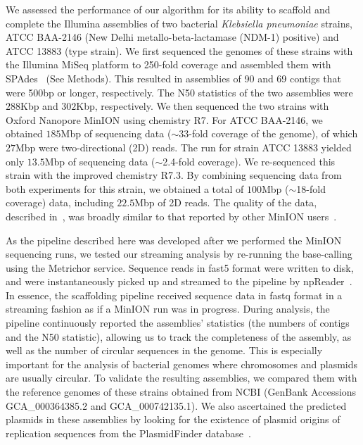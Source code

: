 We assessed the performance of our algorithm for its ability to scaffold and complete the
Illumina assemblies of two bacterial \emph{Klebsiella pneumoniae} strains, ATCC
BAA-2146 (New Delhi metallo-beta-lactamase (NDM-1) positive)
and ATCC 13883 (type strain).
We first sequenced the genomes of these strains with the Illumina MiSeq platform to 250-fold
coverage and assembled them with SPAdes~\cite{BankevichNA2012}
(See Methods). This resulted in assemblies of 90 and 69 contigs
that were 500bp or longer, respectively. The N50 statistics of the two
assemblies were $288$Kbp and $302$Kbp, respectively.
We then sequenced the two strains with Oxford Nanopore MinION using chemistry R7. 
For ATCC BAA-2146, we obtained $185$Mbp of sequencing data ($\sim$33-fold
coverage of the genome), of which $27$Mbp were two-directional (2D) reads. The run for strain ATCC
13883 yielded only $13.5$Mbp of sequencing data ($\sim$2.4-fold coverage). 
We re-sequenced this strain with the improved chemistry R7.3.
By combining sequencing data from both experiments for this strain, we obtained
a total of $100$Mbp ($\sim$18-fold coverage) data, including $22.5$Mbp of 2D reads.
The quality of the data, described in~\cite{CaoGE2016}, was broadly
similar to that reported by other MinION users~\cite{LomanQ2014, AshtonND2015,
JainFM2015}.

As the pipeline described here was developed after we performed the MinION
sequencing runs, we tested our streaming analysis by re-running the base-calling
using the Metrichor service. Sequence reads in fast5 format were written to disk,
and were instantaneously picked up and streamed to the pipeline by
npReader~\cite{CaoGC2016}. In essence, the scaffolding pipeline received
sequence data in fastq format in a streaming fashion as if a MinION run was
in progress. 
During analysis, the pipeline continuously reported the assemblies'
statistics (the numbers of contigs and the N50 statistic), allowing us to track
the completeness of the assembly, as well as the number of circular sequences in
the genome. This is especially important for the analysis of bacterial genomes
where chromosomes and plasmids are usually circular.
To validate the resulting assemblies, we compared them with the reference
genomes of these strains obtained from NCBI (GenBank Accessions GCA\_000364385.2
and GCA\_000742135.1). We also ascertained the predicted plasmids in these
assemblies by looking for the existence of plasmid origins of replication
sequences from the PlasmidFinder database~\cite{CarattoliZG2014}.



